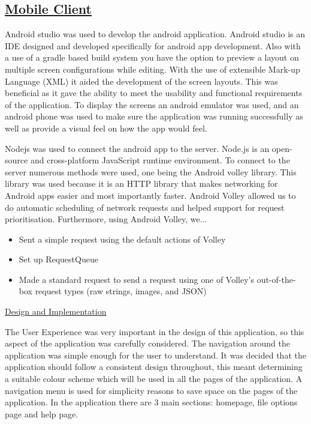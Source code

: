 \documentclass{article}
\begin{document}
\subsection{\underline{Mobile Client}}
Android studio was used to develop the android application. Android studio is an IDE designed and developed specifically for android app development. Also with a use of a gradle based build system you have the option to preview a layout on multiple screen configurations while editing. With the use of extensible Mark-up Language (XML) it aided the development of the screen layouts. This was beneficial as it gave the ability to meet the usability and functional requirements of the application. To display the screens an android emulator was used, and an android phone was used to make sure the application was running successfully as well as provide a visual feel on how the app would feel.

Nodejs was used to connect the android app to the server. Node.js is an open-source and cross-platform JavaScript runtime environment. To connect to the server numerous methods were used, one being the Android volley library. This library was used because it is an HTTP library that makes networking for Android apps easier and most importantly faster. Android Volley allowed us to do automatic scheduling of network requests and helped support for request prioritisation.  Furthermore, using Android Volley, we...
\begin{itemize}
\item Sent a simple request using the default actions of Volley
\item Set up RequestQueue
\item Made a standard request to send a request using one of Volley's out-of-the-box request types (raw strings, images, and JSON)
\end{itemize}

\underline{Design and Implementation}

The User Experience was very important in the design of this application, so this aspect of the application was carefully considered. The navigation around the application was simple enough for the user to understand. It was decided that the application should follow a consistent design throughout, this meant determining a suitable colour scheme which will be used in all the pages of the application. A navigation menu is used for simplicity reasons to save space on the pages of the application. In the application there are 3 main sections: homepage, file options page and help page. 
\end{document}
